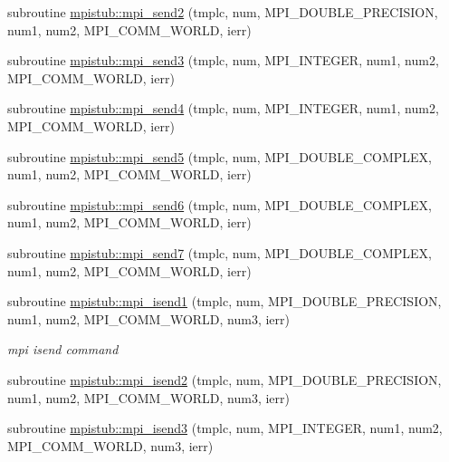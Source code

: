 \begin{DoxyCompactItemize}
subroutine \mbox{\hyperlink{namespacempistub_a6c4e68898245f7cb86fa2854a852a0e4}{mpistub\+::mpi\+\_\+send2}} (tmplc, num, M\+P\+I\+\_\+\+D\+O\+U\+B\+L\+E\+\_\+\+P\+R\+E\+C\+I\+S\+I\+ON, num1, num2, M\+P\+I\+\_\+\+C\+O\+M\+M\+\_\+\+W\+O\+R\+LD, ierr)
\item 
subroutine \mbox{\hyperlink{namespacempistub_aa2236bd3615856981e15e75fd85bce13}{mpistub\+::mpi\+\_\+send3}} (tmplc, num, M\+P\+I\+\_\+\+I\+N\+T\+E\+G\+ER, num1, num2, M\+P\+I\+\_\+\+C\+O\+M\+M\+\_\+\+W\+O\+R\+LD, ierr)
\item 
subroutine \mbox{\hyperlink{namespacempistub_a1c957856f9f59c126b5a38101eb016b2}{mpistub\+::mpi\+\_\+send4}} (tmplc, num, M\+P\+I\+\_\+\+I\+N\+T\+E\+G\+ER, num1, num2, M\+P\+I\+\_\+\+C\+O\+M\+M\+\_\+\+W\+O\+R\+LD, ierr)
\item 
subroutine \mbox{\hyperlink{namespacempistub_a46c983917eca3492fa5ad9eadbb25b2e}{mpistub\+::mpi\+\_\+send5}} (tmplc, num, M\+P\+I\+\_\+\+D\+O\+U\+B\+L\+E\+\_\+\+C\+O\+M\+P\+L\+EX, num1, num2, M\+P\+I\+\_\+\+C\+O\+M\+M\+\_\+\+W\+O\+R\+LD, ierr)
\item 
subroutine \mbox{\hyperlink{namespacempistub_a1a0436836f0028c31fba295fbbe17859}{mpistub\+::mpi\+\_\+send6}} (tmplc, num, M\+P\+I\+\_\+\+D\+O\+U\+B\+L\+E\+\_\+\+C\+O\+M\+P\+L\+EX, num1, num2, M\+P\+I\+\_\+\+C\+O\+M\+M\+\_\+\+W\+O\+R\+LD, ierr)
\item 
subroutine \mbox{\hyperlink{namespacempistub_a572c98a51712ea28686e837f62e0a660}{mpistub\+::mpi\+\_\+send7}} (tmplc, num, M\+P\+I\+\_\+\+D\+O\+U\+B\+L\+E\+\_\+\+C\+O\+M\+P\+L\+EX, num1, num2, M\+P\+I\+\_\+\+C\+O\+M\+M\+\_\+\+W\+O\+R\+LD, ierr)
\item 
subroutine \mbox{\hyperlink{namespacempistub_a2aebc613876246484fb3daea092c2abe}{mpistub\+::mpi\+\_\+isend1}} (tmplc, num, M\+P\+I\+\_\+\+D\+O\+U\+B\+L\+E\+\_\+\+P\+R\+E\+C\+I\+S\+I\+ON, num1, num2, M\+P\+I\+\_\+\+C\+O\+M\+M\+\_\+\+W\+O\+R\+LD, num3, ierr)
\begin{DoxyCompactList}\small\item\em mpi isend command \end{DoxyCompactList}\item 
subroutine \mbox{\hyperlink{namespacempistub_ac35bd42a69c258e2cc6e8db36212b3aa}{mpistub\+::mpi\+\_\+isend2}} (tmplc, num, M\+P\+I\+\_\+\+D\+O\+U\+B\+L\+E\+\_\+\+P\+R\+E\+C\+I\+S\+I\+ON, num1, num2, M\+P\+I\+\_\+\+C\+O\+M\+M\+\_\+\+W\+O\+R\+LD, num3, ierr)
\item 
subroutine \mbox{\hyperlink{namespacempistub_a47d130d2122c960528cefcdd0295e596}{mpistub\+::mpi\+\_\+isend3}} (tmplc, num, M\+P\+I\+\_\+\+I\+N\+T\+E\+G\+ER, num1, num2, M\+P\+I\+\_\+\+C\+O\+M\+M\+\_\+\+W\+O\+R\+LD, num3, ierr)

\end{DoxyCompactItemize}
